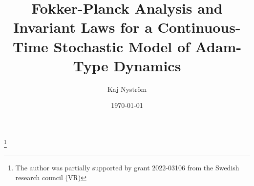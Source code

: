 \documentclass[11pt, a4paper,leqno]{amsart}
\theoremstyle{definition}
\numberwithin{equation}{section}
\begin{document}
\title[Invariant Laws and Fokker-Planck Analysis of Adam-Type Dynamics]{Fokker-Planck Analysis and Invariant Laws for a Continuous-Time Stochastic Model of Adam-Type Dynamics}





\address{Kaj Nystr\"{o}m\\Department of Mathematics, Uppsala University\\
S-751 06 Uppsala, Sweden}









\author{Kaj Nystr{\"o}m}\thanks{The author was partially supported by grant 2022-03106 from the Swedish research council (VR)}
\date{\today}
\maketitle
\end{document}
